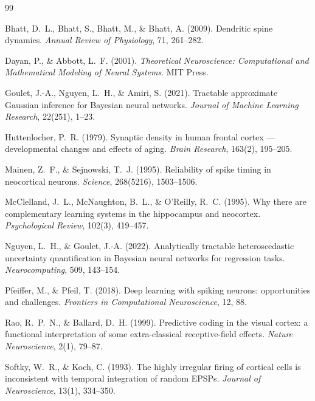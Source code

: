 \documentclass[12pt, a4paper]{article}
\begin{document}
\begin{thebibliography}{99}

Bhatt, D.~L., Bhatt, S., Bhatt, M., \& Bhatt, A. (2009).
Dendritic spine dynamics.
\textit{Annual Review of Physiology}, 71, 261--282.

Dayan, P., \& Abbott, L.~F. (2001).
\textit{Theoretical Neuroscience: Computational and Mathematical Modeling of Neural
Systems}.
MIT Press.

Goulet, J.-A., Nguyen, L.~H., \& Amiri, S. (2021).
Tractable approximate Gaussian inference for Bayesian neural networks.
\textit{Journal of Machine Learning Research}, 22(251), 1--23.

Huttenlocher, P.~R. (1979).
Synaptic density in human frontal cortex --- developmental changes and effects of
aging.
\textit{Brain Research}, 163(2), 195--205.

Mainen, Z.~F., \& Sejnowski, T.~J. (1995).
Reliability of spike timing in neocortical neurons.
\textit{Science}, 268(5216), 1503--1506.

McClelland, J.~L., McNaughton, B.~L., \& O'Reilly, R.~C. (1995).
Why there are complementary learning systems in the hippocampus and neocortex.
\textit{Psychological Review}, 102(3), 419--457.

Nguyen, L.~H., \& Goulet, J.-A. (2022).
Analytically tractable heteroscedastic uncertainty quantification in Bayesian neural
networks for regression tasks.
\textit{Neurocomputing}, 509, 143--154.

Pfeiffer, M., \& Pfeil, T. (2018).
Deep learning with spiking neurons: opportunities and challenges.
\textit{Frontiers in Computational Neuroscience}, 12, 88.

Rao, R.~P.~N., \& Ballard, D.~H. (1999).
Predictive coding in the visual cortex: a functional interpretation of some
extra-classical receptive-field effects.
\textit{Nature Neuroscience}, 2(1), 79--87.

Softky, W.~R., \& Koch, C. (1993).
The highly irregular firing of cortical cells is inconsistent with temporal integration
of random EPSPs.
\textit{Journal of Neuroscience}, 13(1), 334--350.


\end{thebibliography}
\end{document}
